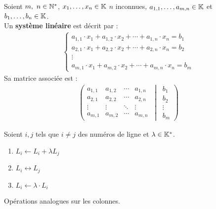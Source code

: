 \begin{definition}
    Soient $m,\ n \in \mathbb{N}^*$, $x_1, \ldots, x_n \in \mathbb{K}$ $n$ inconnues, $a_{1, 1}, \ldots, a_{m,n} \in \mathbb{K}$ et $b_1, \ldots, b_n \in \mathbb{K}$.
    \\
    Un \textbf{système linéaire} est décrit par :
    \begin{align*}
        \begin{cases}
            a_{1,1} \cdot x_1 + a_{1,2} \cdot x_2 + \cdots + a_{1,n} \cdot x_n = b_1 \\
            a_{2,1} \cdot x_1 + a_{2,2} \cdot x_2 + \cdots + a_{2,n} \cdot x_n = b_2 \\
            \vdots \\
            a_{m,1} \cdot x_1 + a_{m,2} \cdot x_2 + \cdots + a_{m,n} \cdot x_n = b_m
        \end{cases}
    \end{align*}        
    Sa matrice associée est : 
    \begin{align*}
        \left(
        \begin{matrix}    
            a_{1,1} & a_{1,2} & \cdots & a_{1,n} \\
            a_{2,1} & a_{2,2} & \cdots & a_{2,n} \\
            \vdots & \vdots & \ddots & \vdots \\
            a_{m,1} & a_{m,2} & \cdots & a_{m,n}
        \end{matrix}
        \
        \middle|
        \
        \begin{matrix}
            b_1 \\
            b_2 \\
            \vdots \\
            b_m
        \end{matrix}
        \right)
    \end{align*}
\end{definition}

\begin{definition}
	Soient $i, j$ tels que $i \neq j$ des numéros de ligne et $\lambda \in \mathbb{K}^*$.
	\begin{enumerate}
		\item $L_i \leftarrow L_i + \lambda L_j$ 
		\item $L_i \leftrightarrow L_j$
		\item $L_i \leftarrow \lambda \cdot L_i$
	\end{enumerate}
	Opérations analogues sur les colonnes.
\end{definition}

